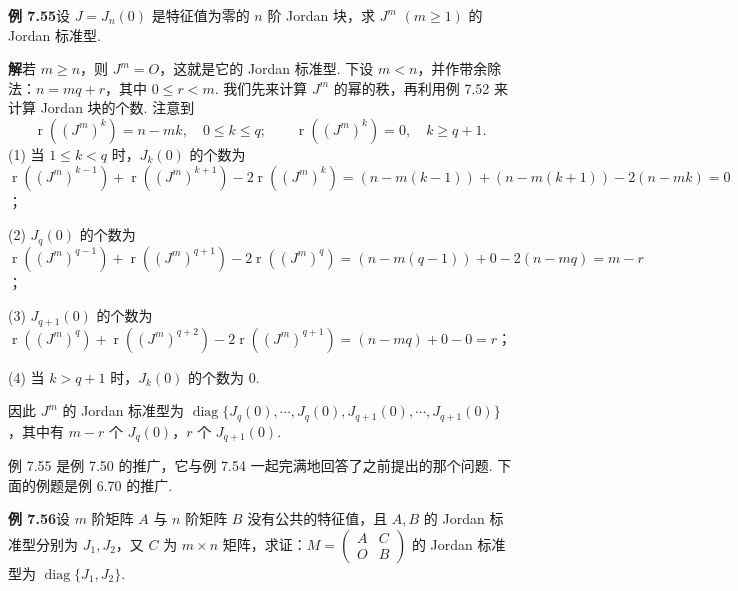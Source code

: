 \documentclass[UTF8,12pt,a4paper,fontset=fandol]{ctexart}
\begin{document}
\noindent\textbf{例 7.55}\quad 设 $J=J_n(0)$ 是特征值为零的 $n$ 阶 Jordan 块，求 $J^m$ $(m\ge 1)$ 的 Jordan 标准型.

\noindent\textbf{解}\quad 若 $m\ge n$，则 $J^m=O$，这就是它的 Jordan 标准型. 下设 $m<n$，并作带余除法：$n=mq+r$，其中 $0\le r<m$. 我们先来计算 $J^m$ 的幂的秩，再利用例 7.52 来计算 Jordan 块的个数. 注意到
\[
\operatorname{r}((J^m)^k)=n-mk,\quad 0\le k\le q;\qquad
\operatorname{r}((J^m)^k)=0,\quad k\ge q+1.
\]
(1) 当 $1\le k<q$ 时，$J_k(0)$ 的个数为 $\operatorname{r}((J^m)^{k-1})+\operatorname{r}((J^m)^{k+1})-2\operatorname{r}((J^m)^k)=(n-m(k-1))+(n-m(k+1))-2(n-mk)=0$；

(2) $J_q(0)$ 的个数为 $\operatorname{r}((J^m)^{q-1})+\operatorname{r}((J^m)^{q+1})-2\operatorname{r}((J^m)^q)=(n-m(q-1))+0-2(n-mq)=m-r$；

(3) $J_{q+1}(0)$ 的个数为 $\operatorname{r}((J^m)^q)+\operatorname{r}((J^m)^{q+2})-2\operatorname{r}((J^m)^{q+1})=(n-mq)+0-0=r$；

(4) 当 $k>q+1$ 时，$J_k(0)$ 的个数为 0.

因此 $J^m$ 的 Jordan 标准型为 $\operatorname{diag}\{J_q(0),\cdots,J_q(0),J_{q+1}(0),\cdots,J_{q+1}(0)\}$，其中有 $m-r$ 个 $J_q(0)$，$r$ 个 $J_{q+1}(0)$.

例 7.55 是例 7.50 的推广，它与例 7.54 一起完满地回答了之前提出的那个问题. 下面的例题是例 6.70 的推广.

\noindent\textbf{例 7.56}\quad 设 $m$ 阶矩阵 $A$ 与 $n$ 阶矩阵 $B$ 没有公共的特征值，且 $A,B$ 的 Jordan 标准型分别为 $J_1,J_2$，又 $C$ 为 $m\times n$ 矩阵，求证：$M=\left(\begin{array}{cc}A&C\\O&B\end{array}\right)$ 的 Jordan 标准型为 $\operatorname{diag}\{J_1,J_2\}$.
\end{document}
